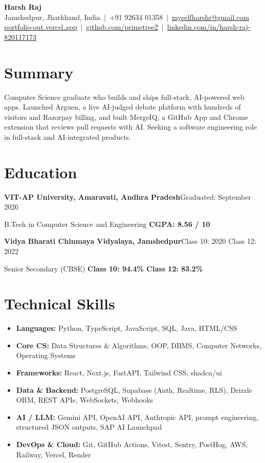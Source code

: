 \documentclass[10pt]{article}
\newcommand{\entryhead}[2]{\textbf{#1}\hfill #2\par}
\begin{document}
\begin{center}
  {\LARGE\bfseries Harsh Raj}\\[2pt]
  {\small
  Jamshedpur, Jharkhand, India \,$|$\, +91 92634 01358 \,$|$\,
  \href{mailto:myselfharshr@gmail.com}{myselfharshr@gmail.com}\\[1pt]
  \href{https://portfolio-out.vercel.app/}{portfolio-out.vercel.app} \,$|$\,
  \href{https://github.com/primetree2}{github.com/primetree2} \,$|$\,
  \href{https://www.linkedin.com/in/harsh-raj-820117173/}{linkedin.com/in/harsh-raj-820117173}}
\end{center}

\section*{Summary}
Computer Science graduate who builds and ships full-stack, AI-powered web apps. Launched Arguen, a live AI-judged debate platform with hundreds of visitors and Razorpay billing, and built MergeIQ, a GitHub App and Chrome extension that reviews pull requests with AI. Seeking a software engineering role in full-stack and AI-integrated products.

\section*{Education}
\entryhead{VIT-AP University, Amaravati, Andhra Pradesh}{Graduated: September 2026}
B.Tech in Computer Science and Engineering \hfill \textbf{CGPA: 8.56 / 10}\par
\vspace{1pt}
\entryhead{Vidya Bharati Chinmaya Vidyalaya, Jamshedpur}{Class 10: 2020 \quad Class 12: 2022}
Senior Secondary (CBSE) \hfill \textbf{Class 10: 94.4\% \quad Class 12: 83.2\%}\par

\section*{Technical Skills}
\begin{itemize}[leftmargin=0pt, label={}, itemsep=0.5pt]
  \item \textbf{Languages:} Python, TypeScript, JavaScript, SQL, Java, HTML/CSS
  \item \textbf{Core CS:} Data Structures \& Algorithms, OOP, DBMS, Computer Networks, Operating Systems
  \item \textbf{Frameworks:} React, Next.js, FastAPI, Tailwind CSS, shadcn/ui
  \item \textbf{Data \& Backend:} PostgreSQL, Supabase (Auth, Realtime, RLS), Drizzle ORM, REST APIs, WebSockets, Webhooks
  \item \textbf{AI / LLM:} Gemini API, OpenAI API, Anthropic API, prompt engineering, structured JSON outputs, SAP AI Launchpad
  \item \textbf{DevOps \& Cloud:} Git, GitHub Actions, Vitest, Sentry, PostHog, AWS, Railway, Vercel, Render
\end{itemize}
\end{document}
